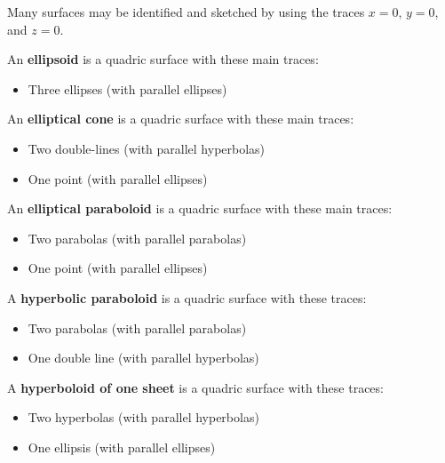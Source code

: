 \documentclass[letterpaper, twoside, 12pt]{book}
\begin{document}
\begin{remark}
  Many surfaces may be identified and sketched by using the traces
  $x=0$, $y=0$, and $z=0$.
\end{remark}

\begin{definition}
  An \textbf{ellipsoid} is a quadric surface with these main traces:
    \begin{itemize}
    \item Three ellipses (with parallel ellipses)
    \end{itemize}
\end{definition}

\begin{definition}
  An \textbf{elliptical cone} is a quadric surface with these main traces:
    \begin{itemize}
    \item Two double-lines (with parallel hyperbolas)
    \item One point (with parallel ellipses)
    \end{itemize}
\end{definition}

\begin{definition}
  An \textbf{elliptical paraboloid} is a quadric surface with these main traces:
    \begin{itemize}
    \item Two parabolas (with parallel parabolas)
    \item One point (with parallel ellipses)
    \end{itemize}
\end{definition}

\begin{definition}
  A \textbf{hyperbolic paraboloid} is a quadric surface with these traces:
    \begin{itemize}
    \item Two parabolas (with parallel parabolas)
    \item One double line (with parallel hyperbolas)
    \end{itemize}
\end{definition}

\begin{definition}
  A \textbf{hyperboloid of one sheet} is a quadric surface with these traces:
    \begin{itemize}
    \item Two hyperbolas (with parallel hyperbolas)
    \item One ellipsis (with parallel ellipses)
    \end{itemize}
\end{definition}
\end{document}

